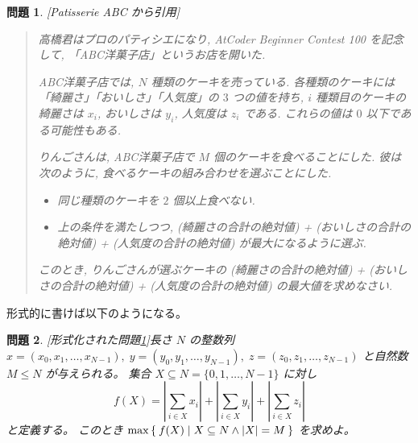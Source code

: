 \documentclass{ltjsarticle}
\newtheorem{problem*}{問題}[section]
\newenvironment{problem}{\begin{problem*}\renewcommand{\qedsymbol}{\(\diamond\)}\pushQED{\qed}}{\popQED\end{problem*}}
\begin{document}
\begin{problem}[Patisserie ABC から引用]\label{patisserie-abc}
    \begin{quotation}
        高橋君はプロのパティシエになり, AtCoder Beginner Contest 100 を記念して, 「ABC洋菓子店」というお店を開いた.

        ABC洋菓子店では, $N$ 種類のケーキを売っている.
        各種類のケーキには「綺麗さ」「おいしさ」「人気度」の $3$ つの値を持ち, $i$ 種類目のケーキの綺麗さは $x_i$, おいしさは $y_i$, 人気度は $z_i$ である.
        これらの値は $0$ 以下である可能性もある.

        りんごさんは, ABC洋菓子店で $M$ 個のケーキを食べることにした.
        彼は次のように, 食べるケーキの組み合わせを選ぶことにした.
        \begin{itemize}
            \item 同じ種類のケーキを $2$ 個以上食べない.
            \item 上の条件を満たしつつ, (綺麗さの合計の絶対値) + (おいしさの合計の絶対値) + (人気度の合計の絶対値) が最大になるように選ぶ.
        \end{itemize}
        このとき, りんごさんが選ぶケーキの (綺麗さの合計の絶対値) + (おいしさの合計の絶対値) + (人気度の合計の絶対値) の最大値を求めなさい.
    \end{quotation}
\end{problem}

形式的に書けば以下のようになる。

\begin{problem}[形式化された問題\ref{patisserie-abc}]\label{patisserie-abc-formal}
    長さ $N$ の整数列 $x = (x_0, x_1, \dots, x _ {N - 1}), \; y = (y_0, y_1, \dots, y _ {N - 1}), \; z = (z_0, z_1, \dots, z _ {N - 1})$ と自然数 $M \le N$ が与えられる。
    集合 $X \subseteq N = \{ 0, 1, \dots, N - 1 \}$ に対し
    \[
        f(X) = \left|\sum_{i \in X} x_i\right| + \left|\sum_{i \in X} y_i\right| + \left|\sum_{i \in X} z_i\right|
    \]
    と定義する。
    このとき $\max \Set{ f(X) | X \subseteq N \land \lvert X \rvert = M }$ を求めよ。
\end{problem}
\end{document}
